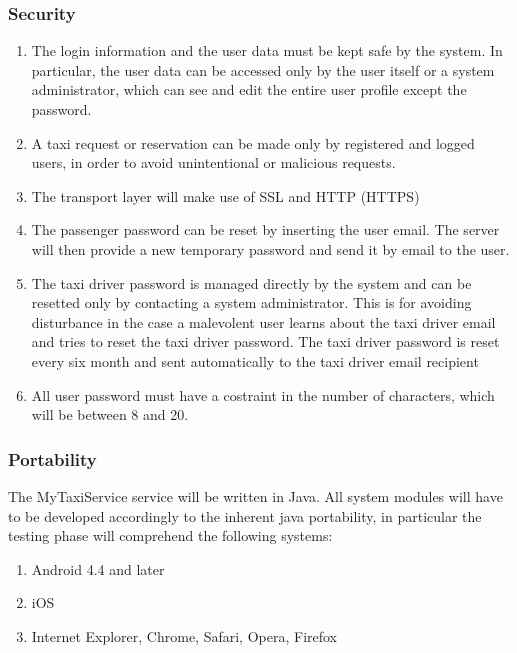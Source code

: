 \documentclass[11pt, a4paper,titlepage]{article}
\newcommand{\productname}{MyTaxiService }
\begin{document}
\subsubsection{Security}
 \begin{enumerate}
 	\item The login information and the user data must be kept safe by the system. In particular, the user data can be accessed only by the user itself or a system administrator, which can see and edit the entire user profile except the password.
 	\item A taxi request or reservation can be made only by registered and logged users, in order to avoid unintentional or malicious requests.
 	\item The transport layer will make use of SSL and HTTP (HTTPS) 
 	\item The passenger password can be reset by inserting the user email. The server will then provide a new temporary password and send it by email to the user.
 	\item The taxi driver password is managed directly by the system and can be resetted only by contacting a system administrator. This is for avoiding disturbance in the case a malevolent user learns about the taxi driver email and tries to reset the taxi driver password. 
 	The taxi driver password is reset every six month and sent automatically to the taxi driver email recipient
 	\item All user password must have a costraint in the number of characters, which will be between 8 and 20.
 \end{enumerate}
\subsubsection{Portability}
	The \productname service will be written in Java. All system modules will have to be developed accordingly to the inherent java portability, in particular the testing phase will comprehend the following systems:
	\begin{enumerate}
		\item Android 4.4 and later
		\item iOS
		\item Internet Explorer, Chrome, Safari, Opera, Firefox
	\end{enumerate}
\end{document}
